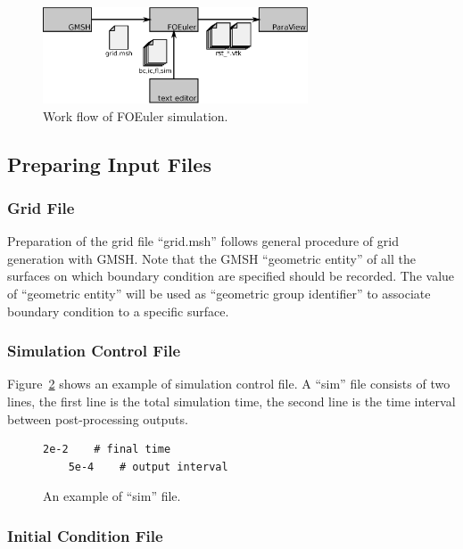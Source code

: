 \documentclass[]{article}
\begin{document}
\begin{figure}[h!]
  \centering
  \includegraphics[width=0.7\textwidth]{flow.eps}
  \caption{Work flow of FOEuler simulation.}
  \label{fig:flow}
\end{figure}

\subsection{Preparing Input Files}

\subsubsection{Grid File}
\label{sec:grid}

Preparation of the grid file ``grid.msh'' follows general procedure of grid generation with GMSH.
Note that the GMSH ``geometric entity'' of all the surfaces on which boundary condition are
specified should be recorded.
The value of ``geometric entity'' will be used as ``geometric group identifier'' to associate
boundary condition to a specific surface.

\subsubsection{Simulation Control File}

Figure~\ref{lst:sim} shows an example of simulation control file.
A ``sim'' file consists of two lines, the first line is the total simulation time, the second line
is the time interval between post-processing outputs.

\begin{figure}[h!]
  \begin{lstlisting}[backgroundcolor=\color{lightgray}]
    2e-2	# final time
    5e-4	# output interval
  \end{lstlisting}
  \caption{An example of ``sim'' file.}
  \label{lst:sim}
\end{figure}

\subsubsection{Initial Condition File}
\end{document}
